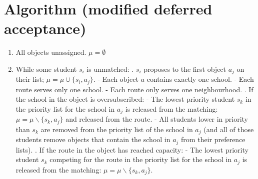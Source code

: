\documentclass{article}
\begin{document}
\section{Algorithm (modified deferred acceptance)}
\begin{enumerate}
\item All objects unassigned. $\mu = \emptyset$
\item While some student $s_i$ is unmatched:
    . $s_i$ proposes to the first object $a_j$ on their list; $\mu = \mu \cup \{s_i, a_j\}$.
        \subsubitem - Each object $a$ contains exactly one school.
        \subsubitem - Each route serves only one school.
        \subsubitem - Each route only serves one neighbourhood.
    . If the school in the object is oversubscribed:
        \subsubitem - The lowest priority student $s_k$ in the priority list for the school in $a_j$ is released from the matching: $\mu = \mu \backslash \{s_k, a_j\}$ and released from the route.
        \subsubitem - All students lower in priority than $s_k$ are removed from the priority list of the school in $a_j$ (and all of those students remove objects that contain the school in $a_j$ from their preference lists).
    . If the route in the object has reached capacity:
        \subsubitem - The lowest priority student $s_k$ competing for the route in the priority list for the school in $a_j$ is released from the matching: $\mu = \mu \backslash \{s_k, a_j\}$.
\end{enumerate}
\end{document}
